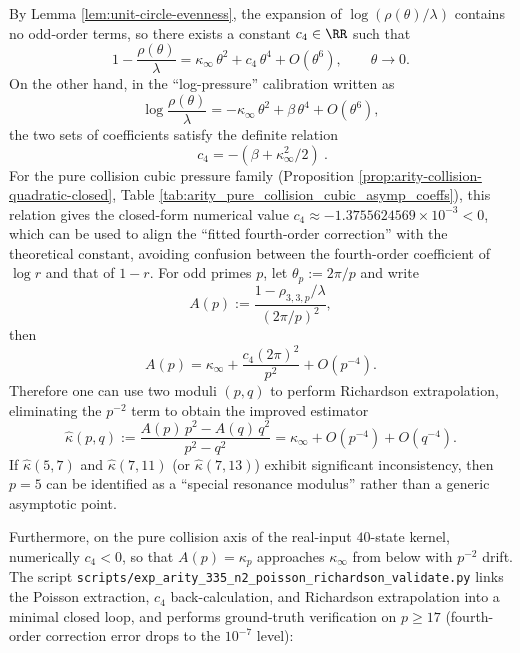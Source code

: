 \begin{remark}\label{rem:arity-335-richardson-kappa}
By Lemma \ref{lem:unit-circle-evenness}, the expansion of $\log(\rho(\theta)/\lambda)$ contains no odd-order terms, so there exists a constant $c_4\in\RR$ such that
\[
1-\frac{\rho(\theta)}{\lambda}
=\kappa_\infty\,\theta^2+c_4\,\theta^4+O(\theta^6),
\qquad \theta\to 0.
\]
On the other hand, in the ``log-pressure'' calibration written as
\[
\log\frac{\rho(\theta)}{\lambda}
=-\kappa_\infty\,\theta^2+\beta\,\theta^4+O(\theta^6),
\]
the two sets of coefficients satisfy the definite relation
\[
\boxed{\ c_4=-(\beta+\kappa_\infty^2/2)\ }.
\]
For the pure collision cubic pressure family (Proposition \ref{prop:arity-collision-quadratic-closed}, Table \ref{tab:arity_pure_collision_cubic_asymp_coeffs}), this relation gives the closed-form numerical value
\(
c_4\approx -1.3755624569\times 10^{-3}<0
\),
which can be used to align the ``fitted fourth-order correction'' with the theoretical constant, avoiding confusion between the fourth-order coefficient of \(\log r\) and that of \(1-r\).
For odd primes $p$, let $\theta_p:=2\pi/p$ and write
\[
A(p):=\frac{1-\rho_{3,3,p}/\lambda}{(2\pi/p)^2},
\]
then
\[
A(p)=\kappa_\infty+\frac{c_4(2\pi)^2}{p^2}+O(p^{-4}).
\]
Therefore one can use two moduli $(p,q)$ to perform Richardson extrapolation, eliminating the $p^{-2}$ term to obtain the improved estimator
\[
\widehat\kappa(p,q)
:=\frac{A(p)\,p^2-A(q)\,q^2}{p^2-q^2}
=\kappa_\infty+O(p^{-4})+O(q^{-4}).
\]
If $\widehat\kappa(5,7)$ and $\widehat\kappa(7,11)$ (or $\widehat\kappa(7,13)$) exhibit significant inconsistency,
then $p=5$ can be identified as a ``special resonance modulus'' rather than a generic asymptotic point.
\par
Furthermore, on the pure collision axis of the real-input $40$-state kernel, numerically \(c_4<0\), so that
\(A(p)=\kappa_p\) approaches \(\kappa_\infty\) from below with \(p^{-2}\) drift.
The script \texttt{scripts/exp\_arity\_335\_n2\_poisson\_richardson\_validate.py} links the Poisson extraction,
\(c_4\) back-calculation, and Richardson extrapolation into a minimal closed loop, and performs ground-truth verification on \(p\ge 17\) (fourth-order correction error drops to the \(10^{-7}\) level):

\end{remark}

